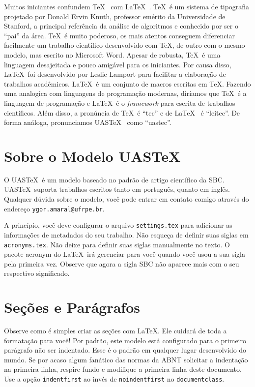 \documentclass[portuguese,noindentfirst]{UASTeX} %
\begin{document}
Muitos iniciantes confundem \TeX~\cite{knuth:91} com \LaTeX~\cite{lamport:94}. \TeX~é um sistema de tipografia projetado por Donald Ervin Knuth, professor emérito da Universidade de Stanford, a principal referência da análise de algoritmos e conhecido por ser o ``pai'' da área. \TeX~é muito poderoso, os mais atentos conseguem diferenciar facilmente um trabalho científico desenvolvido com \TeX, de outro com o mesmo modelo, mas escrito no Microsoft Word\textregistered. Apesar de robusta, \TeX~é uma linguagem desajeitada e pouco amigável para os iniciantes. Por causa disso, \LaTeX~foi desenvolvido por Leslie Lamport para facilitar a elaboração de trabalhos acadêmicos. \LaTeX~é um conjunto de macros escritas em \TeX. Fazendo uma analogica com linguagens de programação modernas, diríamos que \TeX~é a linguagem de programação e \LaTeX~é o \emph{framework} para escrita de trabalhos científicos. Além disso, a pronúncia de \TeX~é ``tec'' e de \LaTeX~ é ``leitec''. De forma análoga, pronunciamos UAS\TeX~ como ``uastec''.

\section{Sobre o Modelo UAS\TeX}\label{sec:uastex}

O UAS\TeX~é um modelo baseado no padrão de artigo científico da \ac{SBC}. UAS\TeX~suporta trabalhos escritos tanto em português, quanto em inglês. Qualquer dúvida sobre o modelo, você pode entrar em contato comigo através do endereço {\tt ygor.amaral@ufrpe.br}.

A princípio, você deve configurar o arquivo {\tt settings.tex} para adicionar as informações de metadados do seu trabalho. Não esqueça de definir suas siglas em {\tt acronyms.tex}. Não deixe para definir suas siglas manualmente no texto. O pacote acronym do \LaTeX~irá gerenciar para você quando você usou a sua sigla pela primeira vez. Observe que agora a sigla \ac{SBC} não aparece mais com o seu respectivo significado.

\section{Seções e Parágrafos}\label{sec:about_secpar}

Observe como é simples criar as seções com \LaTeX. Ele cuidará de toda a formatação para você! Por padrão, este modelo está configurado para o primeiro parágrafo não ser indentado. Esse é o padrão em qualquer lugar desenvolvido do mundo. Se por acaso algum fanático das normas da \ac{ABNT} solicitar a indentação na primeira linha, respire fundo e modifique a primeira linha deste documento. Use a opção {\tt indentfirst} ao invés de {\tt noindentfirst} no {\tt documentclass}.
\end{document}
